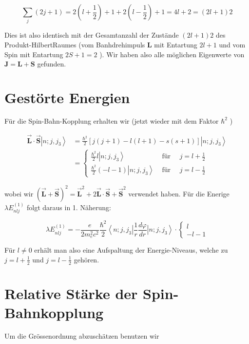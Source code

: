 \documentclass[10pt, letterpaper]{article}
\begin{document}
$$
\sum_{j}(2 j+1)=2\left(l+\frac{1}{2}\right)+1+2\left(l-\frac{1}{2}\right)+1=4 l+2=(2 l+1) 2
$$

Dies ist also identisch mit der Gesamtanzahl der Zustände $(2 l+1) 2$ des Produkt-HilbertRaumes (vom Banhdrehimpuls $\mathbf{L}$ mit Entartung $2 l+1$ und vom Spin mit Entartung $2 S+1=2$ ). Wir haben also alle möglichen Eigenwerte von $\mathbf{J}=\mathbf{L}+\mathbf{S}$ gefunden.

\section*{Gestörte Energien}
Für die Spin-Bahn-Kopplung erhalten wir (jetzt wieder mit dem Faktor $\hbar^{2}$ )

$$
\begin{aligned}
\overrightarrow{\mathbf{L}} \cdot \overrightarrow{\mathbf{S}}\left|n ; j, j_{3}\right\rangle & =\frac{\hbar^{2}}{2}[j(j+1)-l(l+1)-s(s+1)]\left|n ; j, j_{3}\right\rangle \\
& =\left\{\begin{array}{rr}
\frac{\hbar^{2}}{2} l\left|n ; j, j_{3}\right\rangle & \text { für } \quad j=l+\frac{1}{2} \\
\frac{\hbar^{2}}{2}(-l-1)\left|n ; j, j_{3}\right\rangle & \text { für } \quad j=l-\frac{1}{2}
\end{array}\right.
\end{aligned}
$$

wobei wir $(\overrightarrow{\mathbf{L}}+\overrightarrow{\mathbf{S}})^{2}=\overrightarrow{\mathbf{L}}^{2}+2 \overrightarrow{\mathbf{L}} \cdot \overrightarrow{\mathbf{S}}+\overrightarrow{\mathbf{S}}^{2}$ verwendet haben. Für die Enerige $\lambda E_{n l j}^{(1)}$ folgt daraus in 1. Näherung:

$$
\lambda E_{n l j}^{(1)}=-\frac{e}{2 m_{e}^{2} c^{2}} \frac{\hbar^{2}}{2}\left\langle n ; j, j_{3}\right| \frac{1}{r} \frac{d \varphi}{d r}\left|n ; j, j_{3}\right\rangle \cdot\left\{\begin{array}{c}
l \\
-l-1
\end{array}\right.
$$

Für $l \neq 0$ erhält man also eine Aufspaltung der Energie-Niveaus, welche zu $j=l+\frac{1}{2}$ und $j=l-\frac{1}{2}$ gehören.

\section*{Relative Stärke der Spin-Bahnkopplung}
Um die Grössenordnung abzuschätzen benutzen wir
\end{document}
